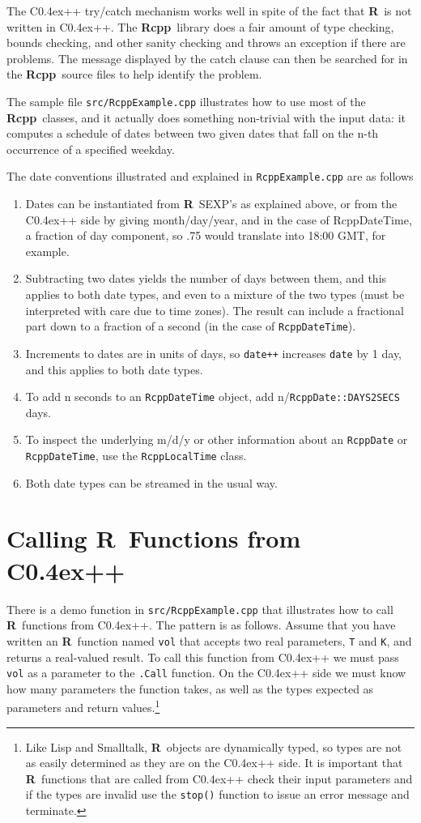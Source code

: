 \documentclass{article}
\def\C++{C{\raise 0.4ex\hbox{\tiny ++}}}
\newcommand{\R}{{\bf R}}
\newcommand{\Rcpp}{{\bf Rcpp}}
\begin{document}
The \C++ try/catch mechanism works well in spite of the fact that \R\
is not written in \C++. The \Rcpp\ library does a fair amount of
type checking, bounds checking, and other sanity checking and throws
an exception if there are problems. The message displayed by the catch
clause can then be searched for in the \Rcpp\ source files to help
identify the problem.

The sample file {\tt src/RcppExample.cpp} illustrates how to use most
of the \Rcpp\ classes, and it actually does something non-trivial
with the input data: it computes a schedule of dates between two 
given dates that fall on the n-th occurrence of a specified weekday.

The date conventions illustrated and explained in {\tt RcppExample.cpp}
are as follows
\begin{enumerate}
  \item Dates can be instantiated from \R\ SEXP's as explained above, or
        from the \C++ side by giving month/day/year, and in the 
        case of RcppDateTime, a fraction of day component, so .75
        would translate into 18:00 GMT, for example.
  \item Subtracting two dates yields the number of days between them, and
        this applies to both date types, and even to a mixture of the
        two types (must be interpreted with care due to time zones). The
        result can include a fractional part down to a fraction 
        of a second (in the case of {\tt RcppDateTime}).
  \item Increments to dates are in units of days, so {\tt date++} increases
        {\tt date} by 1 day, and this applies to both date types.
  \item To add n seconds to an {\tt RcppDateTime} object, add
        n/{\tt RcppDate::DAYS2SECS} days.
  \item To inspect the underlying m/d/y or other information about an
        {\tt RcppDate} or {\tt RcppDateTime}, use 
        the {\tt RcppLocalTime} class.
  \item Both date types can be streamed in the usual way.
\end{enumerate}

\section{Calling \R\ Functions from \C++}

There is a demo function in {\tt src/RcppExample.cpp} that illustrates how to
call \R\ functions from \C++. The pattern is as follows. Assume that
you have written an \R\ function named {\tt vol} that accepts two
real parameters, {\tt T} and {\tt K}, and returns a real-valued 
result. To call this function from \C++ we must pass {\tt vol}
as a parameter to the {\tt .Call} function. On the \C++ side we
must know how many parameters the function takes, as well as the
types expected as parameters and return values.\footnote{Like Lisp and
  Smalltalk, \R\ objects are dynamically typed, so types are not
  as easily determined as they are on the \C++ side. It is important that
  \R\ functions that are called from \C++ check their input parameters
  and if the types are invalid use the {\tt stop()} function to 
  issue an error message and terminate.}
\end{document}
